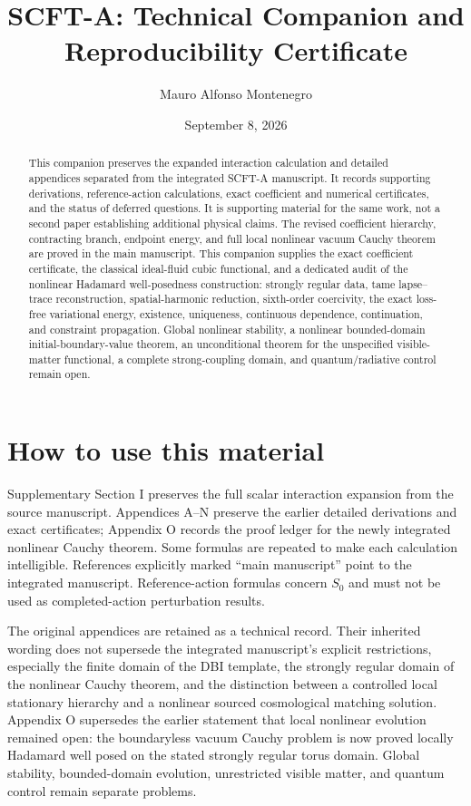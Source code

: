 \documentclass[aps,prd,reprint,onecolumn,notitlepage,nofootinbib,longbibliography,floatfix]{revtex4-2}
\theoremstyle{scstyle}
\theoremstyle{definition}
\theoremstyle{remark}
\begin{document}
\title{SCFT-A: Technical Companion and Reproducibility Certificate}
\author{Mauro Alfonso Montenegro}
\date{September 8, 2026}
\begin{abstract}
This companion preserves the expanded interaction calculation and detailed appendices separated from the integrated SCFT-A manuscript. It records supporting derivations, reference-action calculations, exact coefficient and numerical certificates, and the status of deferred questions. It is supporting material for the same work, not a second paper establishing additional physical claims. The revised coefficient hierarchy, contracting branch, endpoint energy, and full local nonlinear vacuum Cauchy theorem are proved in the main manuscript. This companion supplies the exact coefficient certificate, the classical ideal-fluid cubic functional, and a dedicated audit of the nonlinear Hadamard well-posedness construction: strongly regular data, tame lapse--trace reconstruction, spatial-harmonic reduction, sixth-order coercivity, the exact loss-free variational energy, existence, uniqueness, continuous dependence, continuation, and constraint propagation. Global nonlinear stability, a nonlinear bounded-domain initial-boundary-value theorem, an unconditional theorem for the unspecified visible-matter functional, a complete strong-coupling domain, and quantum/radiative control remain open.
\end{abstract}
\maketitle
\section*{How to use this material}
Supplementary Section I preserves the full scalar interaction expansion from the source manuscript. Appendices A--N preserve the earlier detailed derivations and exact certificates; Appendix O records the proof ledger for the newly integrated nonlinear Cauchy theorem. Some formulas are repeated to make each calculation intelligible. References explicitly marked ``main manuscript'' point to the integrated manuscript. Reference-action formulas concern $S_0$ and must not be used as completed-action perturbation results.

The original appendices are retained as a technical record. Their inherited wording does not supersede the integrated manuscript's explicit restrictions, especially the finite domain of the DBI template, the strongly regular domain of the nonlinear Cauchy theorem, and the distinction between a controlled local stationary hierarchy and a nonlinear sourced cosmological matching solution. Appendix O supersedes the earlier statement that local nonlinear evolution remained open: the boundaryless vacuum Cauchy problem is now proved locally Hadamard well posed on the stated strongly regular torus domain. Global stability, bounded-domain evolution, unrestricted visible matter, and quantum control remain separate problems.
\end{document}

